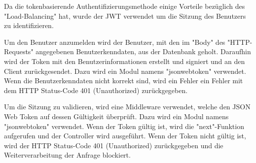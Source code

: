 
Da die tokenbasierende Authentifizierungsmethode einige Vorteile bezüglich des "Load-Balancing" hat, wurde der JWT verwendet um die Sitzung des Benutzers zu identifizieren.


Um den Benutzer anzumelden wird der Benutzer, mit den im "Body" des "HTTP-Requests" angegebenen Benutzerkenndaten, aus der Datenbank geholt. Daraufhin wird der Token mit den Benutzerinformationen erstellt und signiert und an den Client zurückgesendet. Dazu wird ein Modul namens "jsonwebtoken" verwendet. \cite{NpmJWT} Wenn die Benutzerkenndaten nicht korrekt sind, wird ein Fehler ein Fehler mit dem HTTP Status-Code 401 (Unauthorized) zurückgegeben.


\pagebreak
{}

Um die Sitzung zu validieren, wird eine Middleware verwendet, welche den JSON Web Token auf dessen Gültigkeit überprüft. Dazu wird ein Modul namens "jsonwebtoken" verwendet. \cite{NpmJWT} Wenn der Token gültig ist, wird die "next"-Funktion aufgerufen und der Controller wird ausgeführt. Wenn der Token nicht gültig ist, wird der HTTP Status-Code 401 (Unauthorized) zurückgegeben und die Weiterverarbeitung der Anfrage blockiert.

